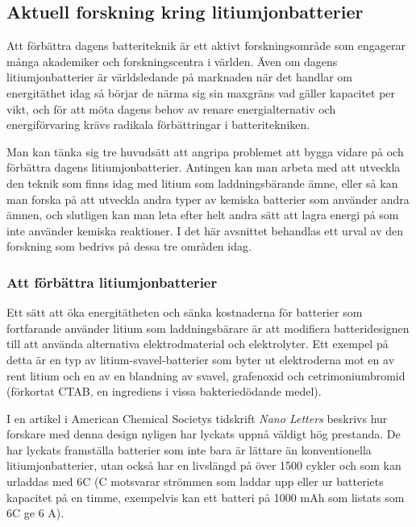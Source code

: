 \documentclass[a4paper,12pt]{article}
\begin{document}
\subsection{Aktuell forskning kring litiumjonbatterier}
Att förbättra dagens batteriteknik är ett aktivt forskningsområde som engagerar många akademiker och forskningscentra i världen. Även om dagens litiumjonbatterier är världsledande på marknaden när det handlar om energitäthet idag så börjar de närma sig sin maxgräns vad gäller kapacitet per vikt, och för att möta dagens behov av renare energialternativ och energiförvaring krävs radikala förbättringar i batteritekniken. \cite{better-battery} 

Man kan tänka sig tre huvudsätt att angripa problemet att bygga vidare på och förbättra dagens litiumjonbatterier. Antingen kan man arbeta med att utveckla den teknik som finns idag med litium som laddningsbärande ämne, eller så kan man forska på att utveckla andra typer av kemiska batterier som använder andra ämnen, och slutligen kan man leta efter helt andra sätt att lagra energi på som inte använder kemiska reaktioner. I det här avsnittet behandlas ett urval av den forskning som bedrivs på dessa tre områden idag.

\subsubsection{Att förbättra litiumjonbatterier}
Ett sätt att öka energitätheten och sänka kostnaderna för batterier som fortfarande använder litium som laddningsbärare är att modifiera batteridesignen till att använda alternativa elektrodmaterial och elektrolyter. Ett exempel på detta är en typ av litium-svavel-batterier som byter ut elektroderna mot en av rent litium och en av en blandning av svavel, grafenoxid och cetrimoniumbromid (förkortat CTAB, en ingrediens i vissa bakteriedödande medel).\cite{li-s}

I en artikel i American Chemical Societys tidskrift \emph{Nano Letters} beskrivs hur forskare med denna design nyligen har lyckats uppnå väldigt hög prestanda. De har lyckats framställa batterier som inte bara är lättare än konventionella litiumjonbatterier, utan också har en livslängd på över 1500 cykler och som kan urladdas med 6C (C motsvarar strömmen som laddar upp eller ur batteriets kapacitet på en timme, exempelvis kan ett batteri på 1000 mAh som listats som 6C ge 6 A). \cite{li-s}
\end{document}
